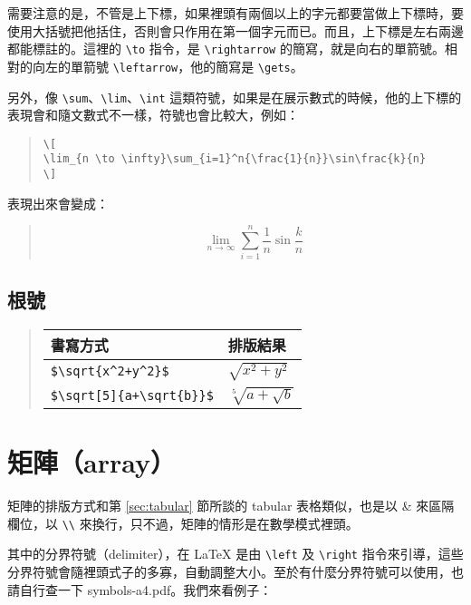 需要注意的是，不管是上下標，如果裡頭有兩個以上的字元都要當做上下標時，要使用大括號把他括住，否則會只作用在第一個字元而已。而且，上下標是左右兩邊都能標註的。這裡的 \verb|\to| 指令，是 \verb|\rightarrow| 的簡寫，就是向右的單箭號。相對的向左的單箭號 \verb|\leftarrow|，他的簡寫是 \verb|\gets|。

另外，像 \verb|\sum|、\verb|\lim|、\verb|\int| 這類符號，如果是在展示數式的時候，他的上下標的表現會和隨文數式不一樣，符號也會比較大，例如：

\begin{quote}
  \begin{verbatim}
\[
\lim_{n \to \infty}\sum_{i=1}^n{\frac{1}{n}}\sin\frac{k}{n}
\]
\end{verbatim}
\end{quote}

表現出來會變成：
\begin{quote}
  \[
    \lim_{n \to \infty}\sum_{i=1}^n{\frac{1}{n}}\sin\frac{k}{n}
  \]
\end{quote}

\subsection{根號}

\begin{quote}
  \begin{tabular}{ll}
    書寫方式                & 排版結果               \\
    \hline
    \verb|$\sqrt{x^2+y^2}$| & $\sqrt{x^2+y^2}$       \\
    \verb|$\sqrt[5]{a+\sqrt{b}}$| & $\sqrt[5]{a+\sqrt{b}}$
  \end{tabular}
\end{quote}

\section{矩陣（array）}

矩陣的排版方式和第 \ref{sec:tabular} 節所談的 tabular 表格類似，也是以 {\ttfamily \&} 來區隔欄位，以 \verb|\\| 來換行，只不過，矩陣的情形是在數學模式裡頭。

其中的分界符號（delimiter），在 \LaTeX{} 是由 \verb|\left| 及 \verb|\right| 指令來引導，這些分界符號會隨裡頭式子的多寡，自動調整大小。至於有什麼分界符號可以使用，也請自行查一下 {\ttfamily symbols-a4.pdf}。我們來看例子：

